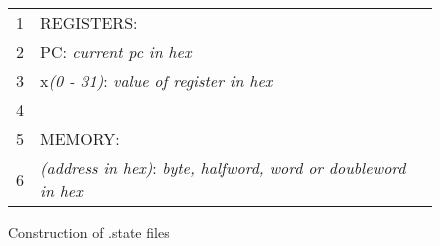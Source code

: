 \begin{figure}
    \begin{tabular}{ll}
        1 & REGISTERS:                                                                    \\
        2 & PC: \textit{current pc in hex}                                                \\
        3 & x\textit{(0 - 31)}: \textit{value of register in hex}                         \\
        4 &                                                                               \\
        5 & MEMORY:                                                                       \\
        6 & \textit{(address in hex)}: \textit{byte, halfword, word or doubleword in hex}
    \end{tabular}
    \caption[Construction of .state files]{Construction of .state files}
    \label{statefileform}
\end{figure}